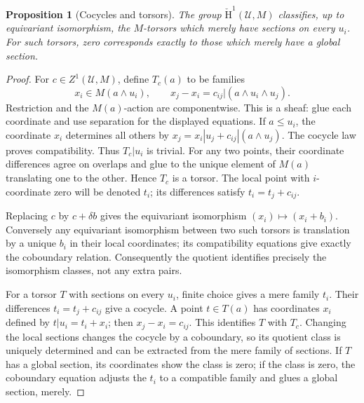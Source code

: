 \documentclass[11pt]{amsart}
\newtheorem{proposition}[theorem]{Proposition}
\theoremstyle{definition}\newtheorem{definition}[theorem]{Definition}
\theoremstyle{remark}\newtheorem{remark}[theorem]{Remark}
\newcommand{\CC}{\check{\mathrm H}}
\begin{document}
\begin{proposition}[Cocycles and torsors]\label{prop:classification}
The group $\CC^1(\mathcal U,M)$ classifies, up to equivariant
isomorphism, the $M$-torsors which merely have sections on every $u_i$.
For such torsors, zero corresponds exactly to those which merely have a
global section.
\end{proposition}
\begin{proof}
For $c\in Z^1(\mathcal U,M)$, define $T_c(a)$ to be families
\[
 x_i\in M(a\wedge u_i),\qquad
 x_j-x_i=c_{ij}|(a\wedge u_i\wedge u_j).
\]
Restriction and the $M(a)$-action are componentwise. This is a sheaf:
glue each coordinate and use separation for the displayed equations.
If $a\le u_i$, the coordinate $x_i$ determines all others by
$x_j=x_i|u_j+c_{ij}|(a\wedge u_j)$. The cocycle law proves
compatibility. Thus $T_c|u_i$ is trivial. For any two points,
their coordinate differences agree on overlaps and glue to the unique
element of $M(a)$ translating one to the other. Hence $T_c$ is a
torsor. The local point with $i$-coordinate zero will be denoted
$t_i$; its differences satisfy $t_i=t_j+c_{ij}$.

Replacing $c$ by $c+\delta b$ gives the equivariant isomorphism
$(x_i)\mapsto(x_i+b_i)$. Conversely any equivariant isomorphism
between two such torsors is translation by a unique $b_i$ in their
local coordinates; its compatibility equations give exactly the
coboundary relation. Consequently the quotient identifies precisely
the isomorphism classes, not any extra pairs.

For a torsor $T$ with sections on every $u_i$, finite choice gives a
mere family $t_i$. Their differences $t_i=t_j+c_{ij}$
give a cocycle. A point $t\in T(a)$ has coordinates $x_i$ defined
by $t|u_i=t_i+x_i$; then $x_j-x_i=c_{ij}$.
This identifies $T$ with $T_c$. Changing the local sections changes
the cocycle by a coboundary, so its quotient class is uniquely
determined and can be extracted from the mere family of sections.
If $T$ has a global section, its coordinates show the class is zero;
if the class is zero, the coboundary equation adjusts the $t_i$ to
a compatible family and glues a global section, merely.
\end{proof}
\end{document}
